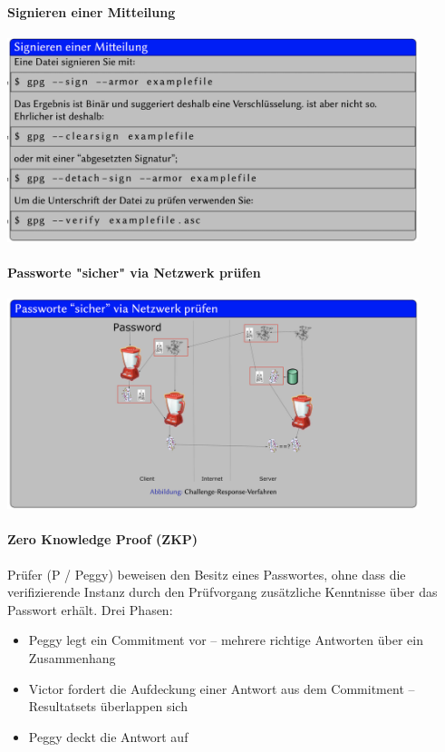 \documentclass[a4paper,12pt]{article}
\begin{document}
\paragraph{Signieren einer Mitteilung}

\begin{center}
\includegraphics[width=12cm]{img/04_pgp_1.png}
\end{center}

\paragraph{Passworte "sicher" via Netzwerk prüfen}

\begin{center}
\includegraphics[width=12cm]{img/04_transfer.png}
\end{center}


\paragraph{Zero Knowledge Proof (ZKP)} Prüfer (P / Peggy) beweisen den Besitz eines Passwortes, ohne dass die verifizierende Instanz durch den Prüfvorgang zusätzliche Kenntnisse über das Passwort erhält. Drei Phasen:
\begin{itemize}
\item Peggy legt ein Commitment vor -- mehrere richtige Antworten über ein Zusammenhang
\item Victor fordert die Aufdeckung einer Antwort aus dem Commitment -- Resultatsets überlappen sich
\item Peggy deckt die Antwort auf
\end{itemize}
\end{document}

